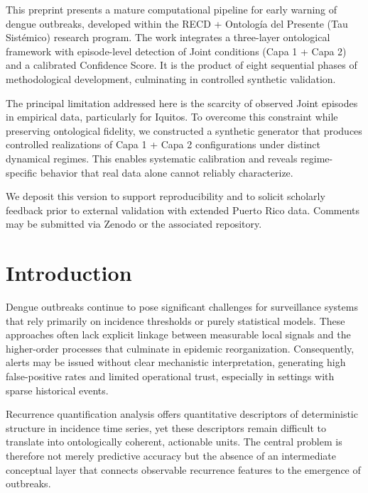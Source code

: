 \documentclass[11pt,a4paper]{article}
\begin{document}
\begin{zenodolletter}
This preprint presents a mature computational pipeline for early warning of dengue outbreaks, developed within the RECD + Ontología del Presente (Tau Sistémico) research program. The work integrates a three-layer ontological framework with episode-level detection of Joint conditions (Capa 1 + Capa 2) and a calibrated Confidence Score. It is the product of eight sequential phases of methodological development, culminating in controlled synthetic validation.

The principal limitation addressed here is the scarcity of observed Joint episodes in empirical data, particularly for Iquitos. To overcome this constraint while preserving ontological fidelity, we constructed a synthetic generator that produces controlled realizations of Capa 1 + Capa 2 configurations under distinct dynamical regimes. This enables systematic calibration and reveals regime-specific behavior that real data alone cannot reliably characterize.

We deposit this version to support reproducibility and to solicit scholarly feedback prior to external validation with extended Puerto Rico data. Comments may be submitted via Zenodo or the associated repository.
\end{zenodolletter}

\vspace{0.5em}

\section{Introduction}

Dengue outbreaks continue to pose significant challenges for surveillance systems that rely primarily on incidence thresholds or purely statistical models. These approaches often lack explicit linkage between measurable local signals and the higher-order processes that culminate in epidemic reorganization. Consequently, alerts may be issued without clear mechanistic interpretation, generating high false-positive rates and limited operational trust, especially in settings with sparse historical events.

Recurrence quantification analysis offers quantitative descriptors of deterministic structure in incidence time series, yet these descriptors remain difficult to translate into ontologically coherent, actionable units. The central problem is therefore not merely predictive accuracy but the absence of an intermediate conceptual layer that connects observable recurrence features to the emergence of outbreaks.
\end{document}
